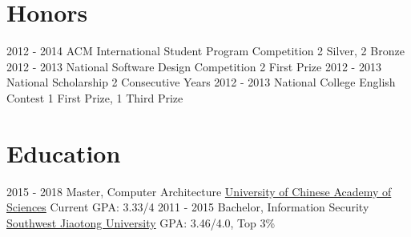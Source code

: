 \documentclass[letterpaper]{twentysecondcv} %
\begin{document}
\section{Honors}
\begin{twenty}
	\twentyitemthree
	{2012 - 2014}
	{ACM International Student Program Competition}
	{2 Silver, 2 Bronze}
	\twentyitemthree
	{2012 - 2013}
	{National Software Design Competition}
	{2 First Prize}
	\twentyitemthree
	{2012 - 2013}
	{National Scholarship}
	{2 Consecutive Years}
	\twentyitemthree
	{2012 - 2013}
	{National College English Contest}
	{1 First Prize, 1 Third Prize}
\end{twenty}


\section{Education}

\begin{twenty} %
	\twentyitem
	{2015 - 2018}
	{Master, Computer Architecture}
	{\href{http://english.cas.cn/}{University of Chinese Academy of Sciences}}
	{}
	{Current GPA: 3.33/4}
	\twentyitem
	{2011 - 2015}
	{Bachelor, Information Security}
	{\href{http://english.swjtu.edu.cn/}{Southwest Jiaotong University}}
	{}
	{GPA: 3.46/4.0, Top 3\%}
\end{twenty}
\end{document}
